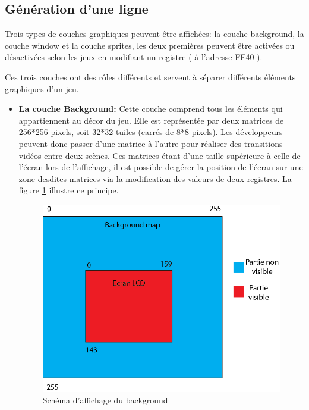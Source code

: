 \documentclass{report}
\begin{document}
\subsection{Génération d'une ligne}

Trois types de couches graphiques peuvent être affichées: la couche background, la couche
window et la couche sprites, les deux premières peuvent être activées ou
désactivées selon les jeux en modifiant un registre ( à l'adresse FF40 ).

Ces trois couches ont des rôles différents et servent à séparer différents
éléments graphiques d'un jeu.\\

\begin{itemize}
\item \textbf{La couche Background:}
	Cette couche comprend tous les éléments qui appartiennent au décor du
jeu. Elle est représentée par deux matrices de 256*256 pixels, soit 32*32
tuiles (carrés de 8*8 pixels). Les développeurs peuvent donc passer d'une matrice à
l'autre pour réaliser des transitions vidéos entre deux scènes. Ces matrices étant
d'une taille supérieure à celle de l'écran lors de l'affichage, il est possible de gérer la position de
l'écran sur une zone desdites matrices via la modification des valeurs de
deux registres. La figure \ref{background} illustre ce principe. 
\\

\begin{figure}[!h]
\centering
\includegraphics[scale=0.8]{images/background.png}
\caption{Schéma d'affichage du background}
\label{background}
\end{figure}


\end{itemize}
\end{document}
